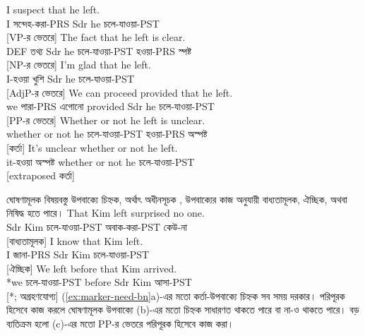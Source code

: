 \ea \label{ex:content-funcs-bn}
    \ea \gll I suspect {\ob}that he left{\cb}.\\
        I সন্দেহ-করা-PRS Sdr he চলে-যাওয়া-PST\\
    \glt {} [VP-র ভেতরে]
    \ex \gll The fact {\ob}that he left{\cb} is clear.\\
        DEF তথ্য Sdr he চলে-যাওয়া-PST হওয়া-PRS স্পষ্ট\\
    \glt {} [NP-র ভেতরে]
    \ex \gll I'm glad {\ob}that he left{\cb}.\\
        I-হওয়া খুশি Sdr he চলে-যাওয়া-PST\\
    \glt {} [AdjP-র ভেতরে]
    \ex \gll We can proceed provided {\ob}that he left{\cb}.\\
        we পারা-PRS এগোনো provided Sdr he চলে-যাওয়া-PST\\
    \glt {} [PP-র ভেতরে]
    \ex \gll Whether or not he left is unclear.\\
        whether or not he চলে-যাওয়া-PST হওয়া-PRS অস্পষ্ট\\
    \glt {} [কর্তা]
    \ex \gll It's unclear whether or not he left.\\
        it-হওয়া অস্পষ্ট whether or not he চলে-যাওয়া-PST\\
    \glt {} [extraposed কর্তা]
    \z
\z

ঘোষণামূলক বিষয়বস্তু উপবাক্যে চিহ্নক, অর্থাৎ অধীনসূচক , উপবাক্যের কাজ অনুযায়ী বাধ্যতামূলক, ঐচ্ছিক, অথবা নিষিদ্ধ হতে পারে।
\ea\label{ex:marker-need-bn}
    \ea \gll That Kim left surprised no one.\\
        Sdr Kim চলে-যাওয়া-PST অবাক-করা-PST কেউ-না\\
    \glt {} [বাধ্যতামূলক]
    \ex \gll I know that Kim left.\\
        I জানা-PRS Sdr Kim চলে-যাওয়া-PST\\
    \glt {} [ঐচ্ছিক]
    \ex \gll *We left before that Kim arrived.\\
        *we চলে-যাওয়া-PST before Sdr Kim আসা-PST\\
    \glt {} [*; অগ্রহণযোগ্য]
\z
\z
(\ref{ex:marker-need-bn}a)-এর মতো কর্তা-উপবাক্যে চিহ্নক সব সময় দরকার। পরিপূরক হিসেবে কাজ করলে ঘোষণামূলক উপবাক্যে (b)-এর মতো চিহ্নক সাধারণত থাকতে পারে বা না-ও থাকতে পারে। বড় ব্যতিক্রম হলো (c)-এর মতো PP-র ভেতরে পরিপূরক হিসেবে কাজ করা।

